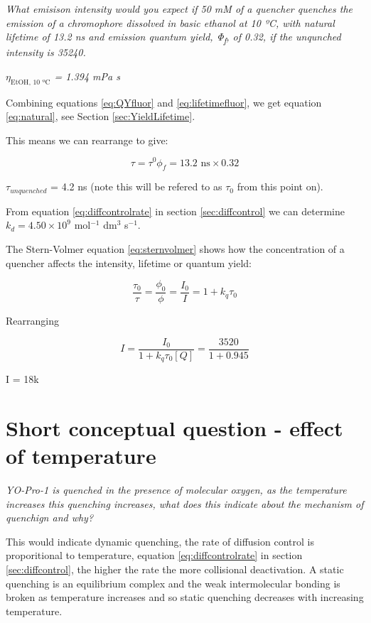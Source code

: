 \documentclass[
]{book}
\begin{document}
\emph{What emisison intensity would you expect if 50 mM of a quencher quenches the emission of a chromophore dissolved in basic ethanol at 10 ºC, with natural lifetime of 13.2 ns and emission quantum yield, Φ\textsubscript{f}, of 0.32, if the unqunched intensity is 35240.}

\emph{\(\eta_ \textrm{EtOH, 10 ºC}\) = 1.394 mPa s}

Combining equations \eqref{eq:QYfluor} and \eqref{eq:lifetimefluor}, we get equation \eqref{eq:natural}, see Section \ref{sec:YieldLifetime}.

This means we can rearrange to give:

\begin{equation*}
\tau = \tau^0 \phi_f = 13.2 \textrm{ ns} \times 0.32
\end{equation*}

\(\tau_{unquenched}\) = 4.2 ns (note this will be refered to as \(\tau_0\) from this point on).

From equation \eqref{eq:diffcontrolrate} in section \ref{sec:diffcontrol} we can determine \(k_d = 4.50 \times 10^9\) mol\(^{-1}\) dm\(^3\) s\(^{-1}\).

The Stern-Volmer equation \eqref{eq:sternvolmer} shows how the concentration of a quencher affects the intensity, lifetime or quantum yield:

\begin{equation}
\frac{\tau_0}{\tau}=\frac{\phi_0}{\phi}=\frac{I_0}{I}=1+ k_q \tau_0
\label{eq:sternvolmer}
\end{equation}

Rearranging

\begin{equation*}
I = \frac{I_0}{1 + k_q \tau_0 [Q]}= \frac{3520}{1+0.945}
\end{equation*}

I = 18k

\hypertarget{sec:temp}{%
\section{Short conceptual question - effect of temperature}\label{sec:temp}}

\emph{YO-Pro-1 is quenched in the presence of molecular oxygen, as the temperature increases this quenching increases, what does this indicate about the mechanism of quenchign and why?}

This would indicate dynamic quenching, the rate of diffusion control is proporitional to temperature, equation \eqref{eq:diffcontrolrate} in section \ref{sec:diffcontrol}, the higher the rate the more collisional deactivation. A static quenching is an equilibrium complex and the weak intermolecular bonding is broken as temperature increases and so static quenching decreases with increasing temperature.
\end{document}
